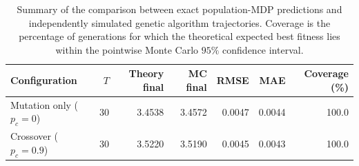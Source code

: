 \begin{table}[t]
    \centering
    \caption{Summary of the comparison between exact population-MDP predictions and independently simulated genetic algorithm trajectories. Coverage is the percentage of generations for which the theoretical expected best fitness lies within the pointwise Monte Carlo $95\%$ confidence interval.}
    \label{tab:combined-ga-trajectory-summary}
    \begin{tabular}{lrrrrrr}
        \hline
        \textbf{Configuration} & \textbf{$T$} & \textbf{Theory final} & \textbf{MC final} & \textbf{RMSE} & \textbf{MAE} & \textbf{Coverage (\%)} \\
        \hline
        Mutation only ($p_c=0$) & 30 & 3.4538 & 3.4572 & 0.0047 & 0.0044 & 100.0 \\
        Crossover ($p_c=0.9$) & 30 & 3.5220 & 3.5190 & 0.0045 & 0.0043 & 100.0 \\
        \hline
    \end{tabular}
\end{table}
